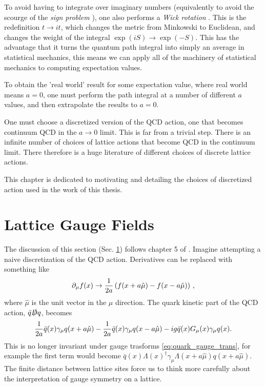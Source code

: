 To avoid having to integrate over imaginary numbers (equivalently to avoid the scourge of the {\it{sign problem}} \cite{deForcrand:2010ys}), one also performs a {\it{Wick rotation}} \cite{PhysRev.96.1124}. This is the redefinition $t\to it$, which changes the metric from Minkowski to Euclidean, and changes the weight of the integral $\exp(iS) \to \exp(-S)$. This has the advantage that it turns the quantum path integral into simply an average in statistical mechanics, this means we can apply all of the machinery of statistical mechanics to computing expectation values.

To obtain the 'real world' result for some expectation value, where real world means $a=0$, one must perform the path integral at a number of different $a$ values, and then extrapolate the results to $a=0$.

One must choose a discretized version of the QCD action, one that becomes continuum QCD in the $a\to 0$ limit. This is far from a trivial step. There is an infinite number of choices of lattice actions that become QCD in the continuum limit. There therefore is a huge literature of different choices of discrete lattice actions.

This chapter is dedicated to motivating and detailing the choices of discretized action used in the work of this thesis.

\section{Lattice Gauge Fields}
\label{sec:gaugefields}

The discussion of this section (Sec. \ref{sec:gaugefields}) follows chapter 5 of \cite{DeGrand:2006zz}.
Imagine attempting a naive discretization of the QCD action. Derivatives can be replaced with something like
\begin{align}
  \partial_{\mu}f(x) \to {1\over 2a} \left( f(x+a\hat{\mu}) - f(x-a\hat{\mu}) \right)\,,
\end{align}
where $\hat{\mu}$ is the unit vector in the $\mu$ direction. The quark kinetic part of the QCD action, $\bar{q}\slashed{D}q$, becomes
\begin{align}
  {1\over 2a} \bar{q}(x)\gamma_{\mu}q(x+a\hat{\mu}) - {1\over 2a} \bar{q}(x)\gamma_{\mu}q(x-a\hat{\mu}) - ig\bar{q}(x)G_{\mu}(x)\gamma_{\mu} q(x).
\end{align}
This is no longer invariant under gauge trasforms \eqref{eq:quark_gauge_trans}, for example the first term would become $\bar{q}(x)\Lambda(x)^{\dagger} \gamma_{\mu} \Lambda(x+a\hat{\mu}) q(x+a\hat{\mu})$. The finite distance between lattice sites force us to think more carefully about the interpretation of gauge symmetry on a lattice.

